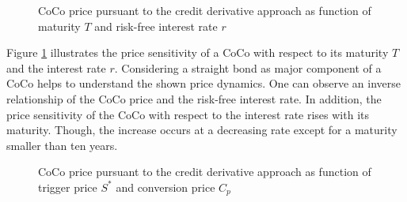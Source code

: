 \begin{figure}[H]
\centering
{}
    \caption[CoCo price pursuant to the equity derivative approach as function of maturity and interest rate]{CoCo price pursuant to the credit derivative approach as function of maturity $T$ and risk-free interest rate $r$}
  \label{fig:ed2}
  \end{figure}

Figure \ref{fig:ed2} illustrates the price sensitivity of a CoCo with respect to its maturity $T$ and the interest rate $r$. Considering a straight bond as major component of a CoCo helps to understand the shown price dynamics. One can observe an inverse relationship of the CoCo price and the risk-free interest rate. In addition, the price sensitivity of the CoCo with respect to the interest rate rises with its maturity. Though, the increase occurs at a decreasing rate except for a maturity smaller than ten years.
 
\begin{figure}[H]
\centering
    \caption[CoCo price pursuant to the equity derivative approach as function of trigger price and conversion price]{CoCo price pursuant to the credit derivative approach as function of trigger price $S^*$ and conversion price $C_p$}
  \label{fig:ed3}
  \end{figure}
  
